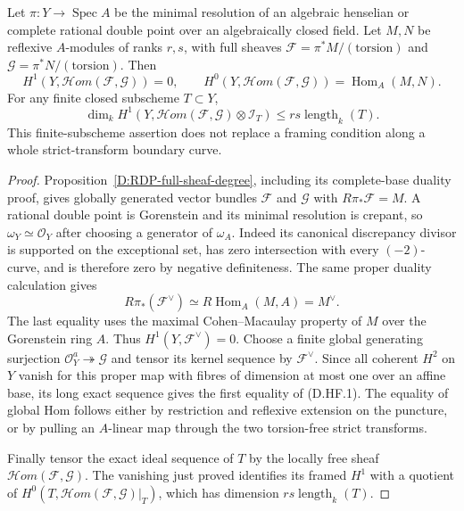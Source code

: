 \begin{lemma}
\label{D:RDP-full-Hom-vanishing}
Let $\pi:Y\to\operatorname{Spec}A$ be the minimal resolution of an
algebraic henselian or complete rational double point over an
algebraically closed field. Let $M,N$ be reflexive $A$-modules of ranks
$r,s$, with full sheaves
$\mathcal F=\pi^*M/(\mathrm{torsion})$ and
$\mathcal G=\pi^*N/(\mathrm{torsion})$. Then
\[
 H^1(Y,\mathcal Hom(\mathcal F,\mathcal G))=0,
 \qquad
 H^0(Y,\mathcal Hom(\mathcal F,\mathcal G))
                  =\operatorname{Hom}_A(M,N).          \tag{D.HF.1}
\]
For any finite closed subscheme $T\subset Y$,
\[
 \dim_k H^1(Y,\mathcal Hom(\mathcal F,\mathcal G)\otimes\mathcal I_T)
                    \le rs\operatorname{length}_k(T). \tag{D.HF.2}
\]
This finite-subscheme assertion does not replace a framing condition
along a whole strict-transform boundary curve.
\end{lemma}
\begin{proof}
Proposition~\ref{D:RDP-full-sheaf-degree}, including its complete-base
duality proof, gives globally generated vector bundles $\mathcal F$
and $\mathcal G$ with $R\pi_*\mathcal F=M$. A rational double point
is Gorenstein and its minimal resolution is crepant, so
$\omega_Y\simeq\mathcal O_Y$ after choosing a generator of
$\omega_A$. Indeed its canonical discrepancy divisor is supported
on the exceptional set, has zero intersection with every $(-2)$-curve,
and is therefore zero by negative definiteness.
The same proper duality calculation gives
\[
 R\pi_*(\mathcal F^\vee)
            \simeq R\operatorname{Hom}_A(M,A)=M^\vee.
\]
The last equality uses the maximal Cohen--Macaulay property of $M$
over the Gorenstein ring $A$. Thus $H^1(Y,\mathcal F^\vee)=0$.
Choose a finite global generating surjection
$\mathcal O_Y^a\twoheadrightarrow\mathcal G$ and tensor its kernel
sequence by $\mathcal F^\vee$. Since all coherent $H^2$ on $Y$
vanish for this proper map with fibres of dimension at most one over
an affine base, its long exact sequence gives the first equality of
(D.HF.1). The equality of global Hom follows either by restriction
and reflexive extension on the puncture, or by pulling an $A$-linear
map through the two torsion-free strict transforms.

Finally tensor the exact ideal sequence of $T$ by the locally free
sheaf $\mathcal Hom(\mathcal F,\mathcal G)$. The vanishing just
proved identifies its framed $H^1$ with a quotient of
$H^0(T,\mathcal Hom(\mathcal F,\mathcal G)|_T)$, which has
dimension $rs\operatorname{length}_k(T)$.
\end{proof}

